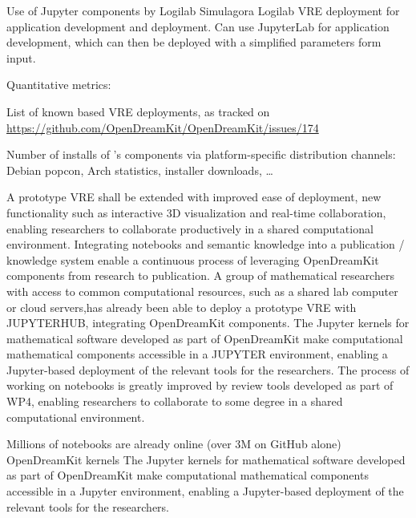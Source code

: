 \begin{Aim 1}
\begin{Aim 2}
\begin{itemize}
       Use of Jupyter components by Logilab
       Simulagora
       Logilab VRE deployment for application development and deployment.
       Can use JupyterLab for application development, which can then be deployed with a simplified parameters form input. %

         
  Quantitative metrics:
\begin{description}
\item List of known \ODK based VRE deployments, as tracked on \url{https://github.com/OpenDreamKit/OpenDreamKit/issues/174}
\item Number of installs of \ODK's components via platform-specific distribution channels: Debian popcon, Arch statistics, installer
  downloads, \dots
\end{description}

A prototype VRE shall be extended with improved ease of deployment, new functionality such as interactive 3D visualization and real-time 
collaboration, enabling researchers to collaborate productively in a shared computational environment. Integrating notebooks and semantic 
knowledge into a publication / knowledge system enable a continuous process of leveraging OpenDreamKit components from research to 
publication.
A group of mathematical researchers with access to common computational resources, such as a shared lab computer or cloud servers,has 
already been able to deploy a prototype VRE with JUPYTERHUB, integrating OpenDreamKit components. The Jupyter kernels for mathematical 
software developed as part of OpenDreamKit make computational mathematical components accessible in a JUPYTER environment, enabling a 
Jupyter-based deployment of the relevant tools for the researchers. The process of working on notebooks is greatly improved by review tools 
developed as part of WP4, enabling researchers to collaborate to some degree in a shared computational environment.

Millions of notebooks are already online (over 3M on GitHub alone)
OpenDreamKit kernels
The Jupyter kernels for mathematical software  developed as part of OpenDreamKit make computational mathematical components accessible in a 
Jupyter environment, enabling a Jupyter-based deployment of the relevant tools for the researchers.


\end{itemize}
\end{Aim 2}
\end{Aim 1}
